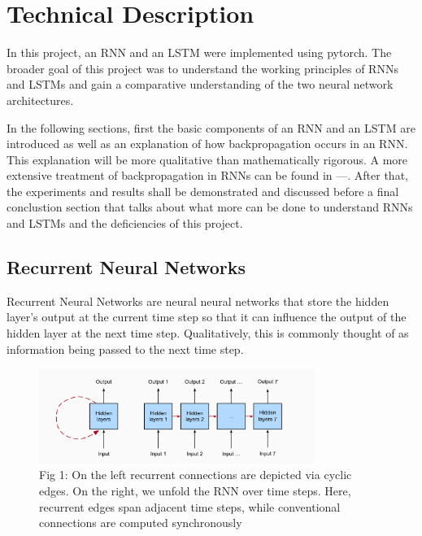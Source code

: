\documentclass[12pt, letterpaper]{article}
\begin{document}


\section{Technical Description}

In this project, an RNN and an LSTM were implemented using pytorch.
The broader goal of this project was to understand the working principles of
RNNs and LSTMs and gain a comparative understanding of the two neural network
architectures. 

In the following sections, first the basic components of an RNN and an LSTM 
are introduced as well as an explanation of how backpropagation occurs in an 
RNN. This explanation will be more qualitative than mathematically rigorous. 
A more extensive treatment of backpropagation in RNNs can be found in ---. After that, the experiments and results shall be demonstrated and discussed before
a final conclustion section that talks about what more can be done to understand
RNNs and LSTMs and the deficiencies of this project.

\subsection{Recurrent Neural Networks}

Recurrent Neural Networks are neural neural networks that store the 
hidden layer's output at the current time step so that it can influence
the output of the hidden layer at the next time step. Qualitatively,
this is commonly thought of as information being passed to the next time
step. 

\begin{figure}[htpb]
    \centering
    \includegraphics[width=0.8\textwidth]{d2l_ai_rnn_v1.png}
    \caption{Fig 1: On the left recurrent connections are depicted via cyclic edges. 
    On the right, we unfold the RNN over time steps. Here, recurrent edges span 
    adjacent time steps, while conventional connections are computed synchronously}
\end{figure}

\printbibliography
\end{document}
